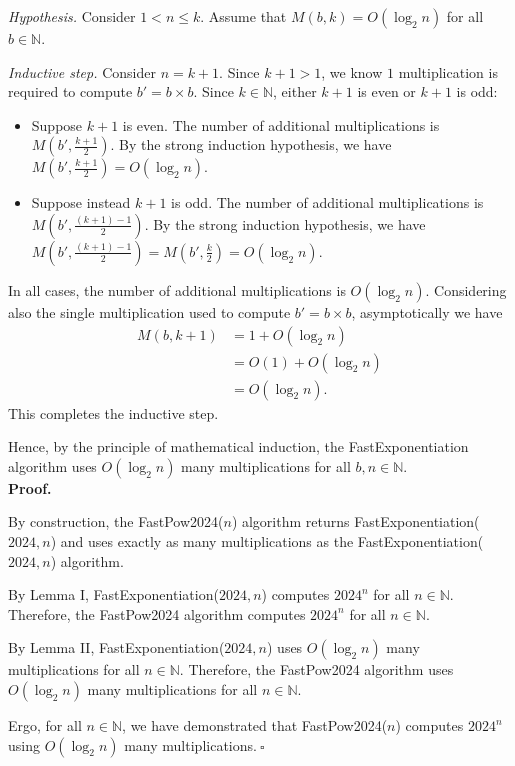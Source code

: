 \begin{enumerate}
\begin{solution}
\textit{Hypothesis. }Consider $1<n\leq k$. Assume that $M(b,k)=O(\log_2 n)$ for all $b\in\mathbb{N}$.

\textit{Inductive step. }Consider $n=k+1$. Since $k+1>1$, we know $1$ multiplication is required to compute $b'=b\times b$. Since $k\in\mathbb{N}$, either $k+1$ is even or $k+1$ is odd:
\begin{itemize}
\item Suppose $k+1$ is even. The number of additional multiplications is $M\left(b',\frac{k+1}{2}\right)$. By the strong induction hypothesis, we have $M\left(b',\frac{k+1}{2}\right)=O(\log_2n)$.
\item Suppose instead $k+1$ is odd. The number of additional multiplications is $M\left(b',\frac{(k+1)-1}{2}\right)$. By the strong induction hypothesis, we have $M\left(b',\frac{(k+1)-1}{2}\right)=M\left(b',\frac{k}{2}\right)=O(\log_2n)$.
\end{itemize}
In all cases, the number of additional multiplications is $O(\log_2n)$. Considering also the single multiplication used to compute $b'=b\times b$, asymptotically we have
\begin{align*}
M(b,k+1)&=1+O(\log_2n)\\
&=O(1)+O(\log_2n)\\
&=O(\log_2n).
\end{align*}
This completes the inductive step.

Hence, by the principle of mathematical induction, the {\sc FastExponentiation} algorithm uses $O(\log_2n)$ many multiplications for all $b,n\in\mathbb{N}$.\\

\textbf{Proof.}

By construction, the {\sc FastPow2024}($n$) algorithm returns {\sc FastExponentiation}($2024,n$) and uses exactly as many multiplications as the {\sc FastExponentiation}($2024,n$) algorithm.

By Lemma I, {\sc FastExponentiation}($2024,n$) computes $2024^n$ for all $n\in\mathbb{N}$. Therefore, the {\sc FastPow2024} algorithm computes $2024^n$ for all $n\in\mathbb{N}$.

By Lemma II, {\sc FastExponentiation}($2024,n$) uses $O(\log_2n)$ many multiplications for all $n\in\mathbb{N}$. Therefore, the {\sc FastPow2024} algorithm uses $O(\log_2n)$ many multiplications for all $n\in\mathbb{N}$.

Ergo, for all $n\in\mathbb{N}$, we have demonstrated that {\sc FastPow2024}($n$) computes $2024^n$ using $O(\log_2n)$ many multiplications.$~\square$
\end{solution}
\newpage
\end{enumerate}
